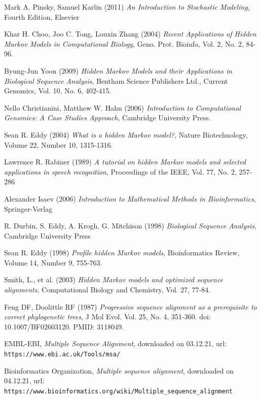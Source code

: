 \documentclass{article}\usepackage[]{graphicx}\usepackage[]{color}
\begin{document}
\begin{thebibliography}{20}

Mark A. Pinsky, Samuel Karlin (2011) \emph{An Introduction to Stochastic Modeling}, Fourth Edition, Elsevier

Khar H. Choo, Joo C. Tong, Louxin Zhang (2004) \emph{Recent Applications of Hidden Markov Models in Computational Biology}, Geno. Prot. Bioinfo, Vol. 2, No. 2, 84-96.

Byung-Jun Yoon (2009) \emph{Hidden Markov Models and their Applications in Biological Sequence Analysis}, Bentham Science Publishers Ltd., Current Genomics, Vol. 10, No. 6, 402-415.

Nello Christianini, Matthew W. Hahn (2006) \emph{Introduction to Computational Genomics: A Case Studies Approach}, Cambridge University Press.

Sean R. Eddy (2004) \emph{What is a hidden Markov model?}, Nature Biotechnology, Volume 22, Number 10, 1315-1316.

Lawrence R. Rabiner (1989) \emph{A tutorial on hidden Markov models and selected applications in speech recognition}, Proceedings of the IEEE, Vol. 77, No. 2, 257-286

Alexander Isaev (2006) \emph{Introduction to Mathematical Methods in Bioinformatics}, Springer-Verlag

R. Durbin, S. Eddy, A. Krogh, G. Mitchison (1998) \emph{Biological Sequence Analysis}, Cambridge University Press

Sean R. Eddy (1998) \emph{Profile hidden Markov models}, Bioinformatics Review, Volume 14, Number 9, 755-763.

Smith, L., et al. (2003) \emph{Hidden Markov models and optimized sequence alignments}, Computational Biology and Chemistry, Vol. 27, 77-84.

Feng DF, Doolittle RF (1987) \emph{Progressive sequence alignment as a prerequisite to correct phylogenetic trees}, J Mol Evol. Vol. 25, No. 4, 351-360. doi: 10.1007/BF02603120. PMID: 3118049.

EMBL-EBI, \emph{Multiple Sequence Alignment}, downloaded on 03.12.21, 
url: \verb$https://www.ebi.ac.uk/Tools/msa/$

Bioinformatics Organization, \emph{Multiple sequence alignment}, downloaded on 04.12.21, 
url: \verb$https://www.bioinformatics.org/wiki/Multiple_sequence_alignment$


\end{thebibliography}
\end{document}
